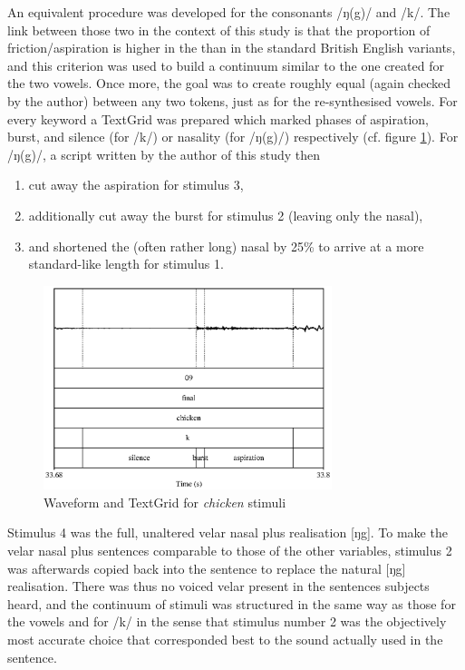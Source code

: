 An equivalent procedure was developed for the consonants /ŋ(g)/ and /k/.
The link between those two in the context of this study is that the proportion of friction/aspiration is higher in the  than in the standard British English variants, and this criterion was used to build a continuum similar to the one created for the two vowels.
Once more, the goal was to create roughly equal  (again checked  by the author) between any two tokens, just as for the re-synthesised vowels.
For every keyword a TextGrid was prepared which marked phases of aspiration, burst, and silence (for /k/) or nasality (for /ŋ(g)/) respectively (cf. figure \ref{fig.chicken.spec}).
For /ŋ(g)/, a script written by the author of this study then

\begin{enumerate}
	\item cut away the aspiration for stimulus 3,
	\item additionally cut away the burst for stimulus 2 (leaving only the nasal),
	\item and shortened the (often rather long) nasal by 25\% to arrive at a more standard-like length for stimulus 1.
\end{enumerate}

\begin{figure}[h]
	\centering
	\includegraphics[width=0.75\textwidth]{./figures/chicken_spectrogram}
	\caption{Waveform and TextGrid for \emph{chicken} stimuli}
	\label{fig.chicken.spec}
\end{figure}

Stimulus 4 was the full, unaltered velar nasal plus realisation [ŋg].
To make the velar nasal plus sentences comparable to those of the other variables, stimulus 2 was afterwards copied back into the sentence to replace the natural [ŋg] realisation.
There was thus no voiced velar  present in the sentences subjects heard, and the continuum of stimuli was structured in the same way as those for the vowels and for /k/ in the sense that stimulus number 2 was the objectively most accurate choice that corresponded best to the sound actually used in the sentence.

